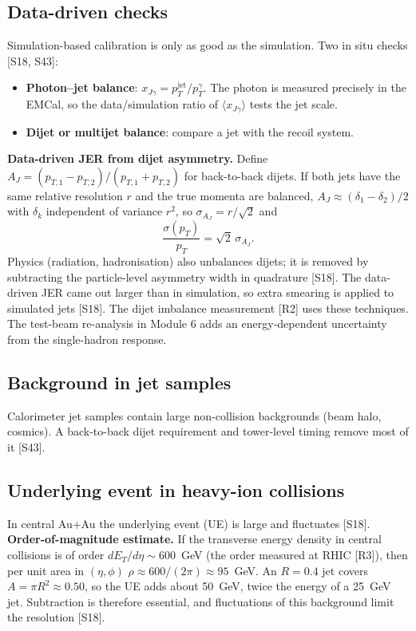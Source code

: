 \documentclass[11pt,letterpaper]{article}
\begin{document}
\subsection{Data-driven checks}
Simulation-based calibration is only as good as the simulation. Two in situ checks [S18, S43]:
\begin{itemize}
\item \textbf{Photon--jet balance}: $x_{J\gamma}=p_T^{\mathrm{jet}}/p_T^\gamma$. The photon is measured precisely in the EMCal, so the data/simulation ratio of $\langle x_{J\gamma}\rangle$ tests the jet scale.
\item \textbf{Dijet or multijet balance}: compare a jet with the recoil system.
\end{itemize}
\textbf{Data-driven JER from dijet asymmetry.} Define $A_J=(p_{T,1}-p_{T,2})/(p_{T,1}+p_{T,2})$ for back-to-back dijets. If both jets have the same relative resolution $r$ and the true momenta are balanced,
$A_J\approx(\delta_1-\delta_2)/2$ with $\delta_k$ independent of variance $r^2$, so $\sigma_{A_J}=r/\sqrt2$ and
\begin{equation}
\frac{\sigma(p_T)}{p_T} = \sqrt2\,\sigma_{A_J}.
\end{equation}
Physics (radiation, hadronisation) also unbalances dijets; it is removed by subtracting the particle-level asymmetry width in quadrature [S18].
The data-driven JER came out larger than in simulation, so extra smearing is applied to simulated jets [S18]. The dijet imbalance measurement [R2] uses these techniques.
The test-beam re-analysis in Module 6 adds an energy-dependent uncertainty from the single-hadron response.

\subsection{Background in jet samples}
Calorimeter jet samples contain large non-collision backgrounds (beam halo, cosmics). A back-to-back dijet requirement and tower-level timing remove most of it [S43].

\subsection{Underlying event in heavy-ion collisions}
In central Au+Au the underlying event (UE) is large and fluctuates [S18].
\textbf{Order-of-magnitude estimate.} If the transverse energy density in central collisions is of order $dE_T/d\eta\sim600$~GeV (the order measured at RHIC [R3]), then per unit area in $(\eta,\phi)$
$\rho\approx600/(2\pi)\approx95$~GeV. An $R=0.4$ jet covers $A=\pi R^2\approx0.50$, so the UE adds about 50~GeV, twice the energy of a 25~GeV jet.
Subtraction is therefore essential, and fluctuations of this background limit the resolution [S18].
\end{document}
